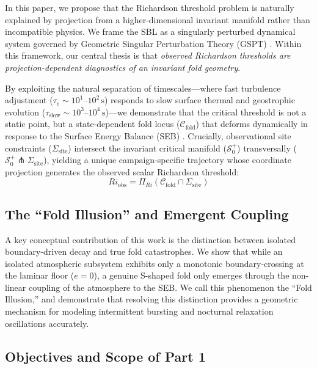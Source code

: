 In this paper, we propose that the Richardson threshold problem is naturally explained by projection from a higher-dimensional invariant manifold rather than incompatible physics. We frame the SBL as a singularly perturbed dynamical system governed by Geometric Singular Perturbation Theory (GSPT) \citep{Fenichel1979, Kuehn2015}. Within this framework, our central thesis is that \emph{observed Richardson thresholds are projection-dependent diagnostics of an invariant fold geometry}.

By exploiting the natural separation of timescales---where fast turbulence adjustment ($\tau_e \sim 10^1\text{--}10^2\,\text{s}$) responds to slow surface thermal and geostrophic evolution ($\tau_{\text{slow}} \sim 10^3\text{--}10^4\,\text{s}$)---we demonstrate that the critical threshold is not a static point, but a state-dependent fold locus ($\mathcal{C}_{\mathrm{fold}}$) that deforms dynamically in response to the Surface Energy Balance (SEB) \citep{VanDeWiel2012}. Crucially, observational site constraints ($\Sigma_{\mathrm{site}}$) intersect the invariant critical manifold ($\mathcal{S}_0^+$) transversally ($\mathcal{S}_0^+ \pitchfork \Sigma_{\mathrm{site}}$), yielding a unique campaign-specific trajectory whose coordinate projection generates the observed scalar Richardson threshold:
$$Ri_{\mathrm{obs}} = \Pi_{Ri}\left(\mathcal{C}_{\mathrm{fold}} \cap \Sigma_{\mathrm{site}}\right)$$

\subsection{The ``Fold Illusion'' and Emergent Coupling}

A key conceptual contribution of this work is the distinction between isolated boundary-driven decay and true fold catastrophes. We show that while an isolated atmospheric subsystem exhibits only a monotonic boundary-crossing at the laminar floor ($e = 0$), a genuine S-shaped fold only emerges through the non-linear coupling of the atmosphere to the SEB. We call this phenomenon the ``Fold Illusion,'' and demonstrate that resolving this distinction provides a geometric mechanism for modeling intermittent bursting and nocturnal relaxation oscillations accurately.

\subsection{Objectives and Scope of Part 1}

